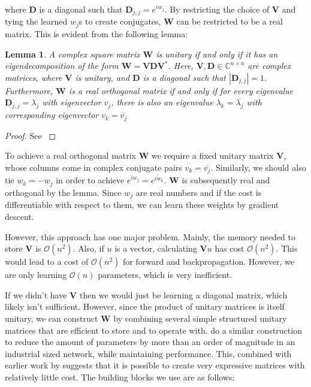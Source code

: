 \documentclass{article} %
\newcommand{\matr}[1]{\mathbf{#1}}
\newtheorem{lemma}{Lemma}
\begin{document}
where $\matr{D}$ is a diagonal such that $\matr{D}_{j,j} = e^{i w_j}$. By restricting the choice of $\matr{V}$ and tying the learned $w_j$s to create conjugates, $\matr{W}$ can be restricted to be a real matrix. This is evident from the following lemma:

\begin{lemma}
  A complex square matrix $\matr{W}$ is unitary if and only if it has an eigendecomposition of the form $\matr{W} = \matr{V} \matr{D} \matr{V}^*$. Here, $\matr{V}, \matr{D} \in \mathbb{C}^{n \times n}$ are complex matrices, where $\matr{V}$ is unitary, and $\matr{D}$ is a diagonal such that $|\matr{D}_{j,j}|=1$. Furthermore, $\matr{W}$ is a real orthogonal matrix if and only if for every eigenvalue $\matr{D}_{j,j} = \lambda_j$ with eigenvector $v_j$, there is also an eigenvalue $\lambda_k = \overline{\lambda_j}$ with corresponding eigenvector $v_k = \overline{v_j}$
\end{lemma}
\begin{proof}
  See \cite{linalgbook}
\end{proof}

To achieve a real orthogonal matrix $\matr{W}$ we require a fixed unitary matrix $\matr{V}$, whose columns come in complex conjugate pairs $v_k = \overline{v_j}$. Similarly, we should also tie $w_k=-w_j$ in order to achieve $e^{i w_j} = \overline{e^{i w_k}}$. $\matr{W}$ is subsequently real and orthogonal by the lemma. Since $w_j$ are real numbers and if the cost is differentiable with respect to them, we can learn these weights by gradient descent. 

However, this approach has one major problem. Mainly, the memory needed to store $\matr{V}$ is $\mathcal{O}\left(n^2\right)$. Also, if $u$ is a vector, calculating $\matr{V}u$ has cost $\mathcal{O}\left( n^2 \right)$. This would lead to a cost of $\mathcal{O} \left( n^2 \right)$ for forward and backpropagation. However, we are only learning $\mathcal{O}(n)$ parameters, which is very inefficient.

If we didn't have $\matr{V}$ then we would just be learning a diagonal matrix, which likely isn't sufficient. However, since the product of unitary matrices is itself unitary, we can construct $\matr{W}$ by combining several simple structured unitary matrices that are efficient to store and to operate with. \cite{dfc} do a similar construction to reduce the amount of parameters by more than an order of magnitude in an industrial sized network, while maintaining performance. This, combined with earlier work by \cite{fastfood} suggests that it is possible to create very expressive matrices with relatively little cost. The building blocks we use are as follows:
\end{document}
